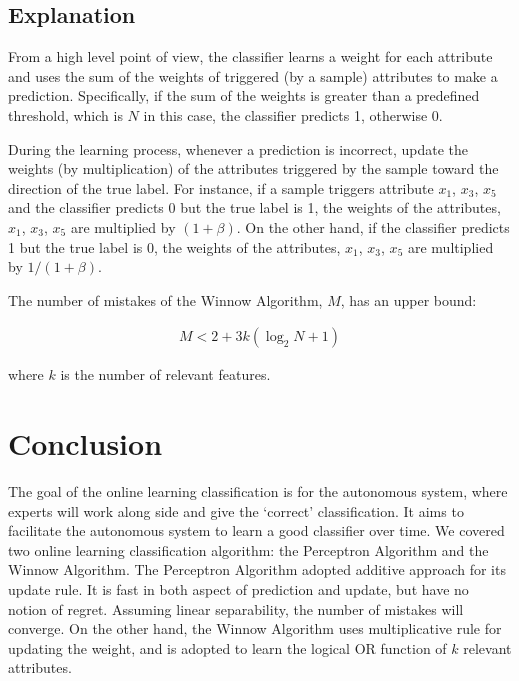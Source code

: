 \documentclass[11pt]{article}
\begin{document}
\subsection{Explanation}

From a high level point of view, the classifier learns a weight for each attribute and uses the sum of the weights of triggered (by a sample) attributes to make a prediction. Specifically, if the sum of the weights is greater than a predefined threshold, which is $N$ in this case, the classifier predicts 1, otherwise 0.

During the learning process, whenever a prediction is incorrect, update the weights (by multiplication) of the attributes triggered by the sample toward the direction of the true label. For instance, if a sample triggers attribute $x_1$, $x_3$, $x_5$ and the classifier predicts 0 but the true label is 1, the weights of the attributes, $x_1$, $x_3$, $x_5$ are multiplied by $(1 + \beta)$. On the other hand, if the classifier predicts 1 but the true label is 0, the weights of the attributes, $x_1$, $x_3$, $x_5$ are multiplied by $1 / (1 + \beta)$.

The number of mistakes of the Winnow Algorithm, $M$, has an upper bound:

\begin{align}
  M < 2 + 3k(\log_2 N + 1)
\end{align}

where $k$ is the number of relevant features.

\section{Conclusion}
The goal of the online learning classification is for the autonomous system, where experts will work along side and give the `correct' classification. It aims to facilitate the autonomous system to learn a good classifier over time. We covered two online learning classification algorithm: the Perceptron Algorithm and the Winnow Algorithm. The Perceptron Algorithm adopted additive approach for its update rule. It is fast in both aspect of prediction and update, but have no notion of regret. Assuming linear separability, the number of mistakes will converge. On the other hand, the Winnow Algorithm uses multiplicative rule for updating the weight, and is adopted to learn the logical OR function of $k$ relevant attributes. 

{


}
\end{document}
